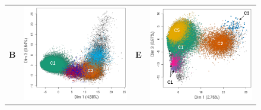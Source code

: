 \documentclass[12pt,a4paper]{article}
\begin{document}
\begin{figure}
\begin{tabular}{cc|cc}
		\textbf{B} & \includegraphics[scale=0.35]{img/solatus_ACP2.png} &  \textbf{E} & \includegraphics[scale=0.35]{img/pogonias_ACP2.png} \\

\end{tabular}
\end{figure}
\end{document}
